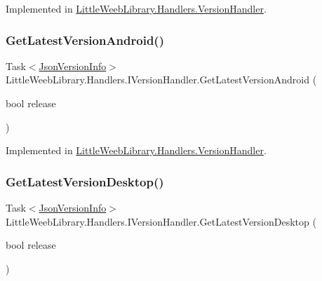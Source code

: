 Implemented in \mbox{\hyperlink{class_little_weeb_library_1_1_handlers_1_1_version_handler_ac2510dcad764a9c925d8da152740f095}{Little\+Weeb\+Library.\+Handlers.\+Version\+Handler}}.

\mbox{\label{interface_little_weeb_library_1_1_handlers_1_1_i_version_handler_a812c819dce905da83c29a48e3aabba2e}} 
\subsubsection{\texorpdfstring{Get\+Latest\+Version\+Android()}{GetLatestVersionAndroid()}}
{\footnotesize\ttfamily Task$<$\mbox{\hyperlink{class_little_weeb_library_1_1_models_1_1_json_version_info}{Json\+Version\+Info}}$>$ Little\+Weeb\+Library.\+Handlers.\+I\+Version\+Handler.\+Get\+Latest\+Version\+Android (\begin{DoxyParamCaption}\item[{bool}]{release }\end{DoxyParamCaption})}



Implemented in \mbox{\hyperlink{class_little_weeb_library_1_1_handlers_1_1_version_handler_a4021041fcc24a7f9489060c598222891}{Little\+Weeb\+Library.\+Handlers.\+Version\+Handler}}.

\mbox{\label{interface_little_weeb_library_1_1_handlers_1_1_i_version_handler_a0d72fd0650a8bd465bcf22fab766e111}} 
\subsubsection{\texorpdfstring{Get\+Latest\+Version\+Desktop()}{GetLatestVersionDesktop()}}
{\footnotesize\ttfamily Task$<$\mbox{\hyperlink{class_little_weeb_library_1_1_models_1_1_json_version_info}{Json\+Version\+Info}}$>$ Little\+Weeb\+Library.\+Handlers.\+I\+Version\+Handler.\+Get\+Latest\+Version\+Desktop (\begin{DoxyParamCaption}\item[{bool}]{release }\end{DoxyParamCaption})}



